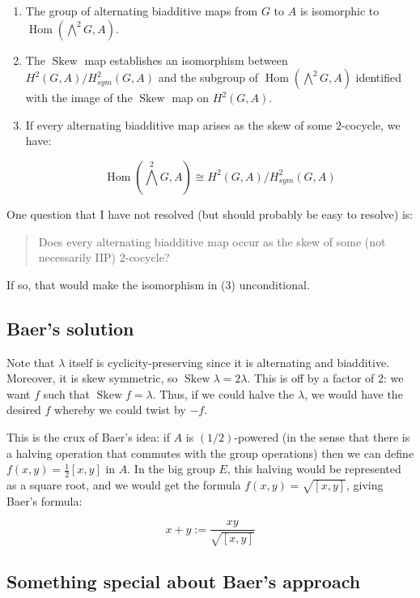 \documentclass[10pt]{amsart}
\newcommand{\Skew}{\operatorname{Skew}}
\begin{document}
\begin{lemma}
  \begin{enumerate}
  \item The group of alternating biadditive maps from $G$ to $A$ is
    isomorphic to $\operatorname{Hom}(\bigwedge^2G,A)$.
  \item The $\Skew$ map establishes an isomorphism between
    $H^2(G,A)/H^2_{sym}(G,A)$ and the subgroup of
    $\operatorname{Hom}(\bigwedge^2G,A)$ identified with the image of
    the $\Skew$ map on $H^2(G,A)$.
  \item If every alternating biadditive map arises as the skew of some
    $2$-cocycle, we have:

    $$\operatorname{Hom}(\bigwedge^2G, A) \cong H^2(G,A)/H^2_{sym}(G,A)$$
  \end{enumerate}
\end{lemma}
One question that I have not resolved (but should probably be easy to
resolve) is:

\begin{quote}
  Does every alternating biadditive map occur as the skew of some (not
  necessarily IIP) $2$-cocycle?
\end{quote}

If so, that would make the isomorphism in (3) unconditional.
\subsection{Baer's solution}


Note that $\lambda$ itself is cyclicity-preserving since it is
alternating and biadditive. Moreover, it is skew symmetric, so $\Skew
\lambda = 2 \lambda$. This is off by a factor of $2$: we want $f$ such
that $\Skew f = \lambda$. Thus, if we could halve the $\lambda$, we
would have the desired $f$ whereby we could twist by $-f$.

This is the crux of Baer's idea: if $A$ is $(1/2)$-powered (in the
sense that there is a halving operation that commutes with the group
operations) then we can define $f(x,y) = \frac{1}{2}[x,y]$ in $A$. In
the big group $E$, this halving would be represented as a square root,
and we would get the formula $f(x,y) = \sqrt{[x,y]}$, giving Baer's
formula:

$$x + y := \frac{xy}{\sqrt{[x,y]}}$$

\subsection{Something special about Baer's approach}
\end{document}
